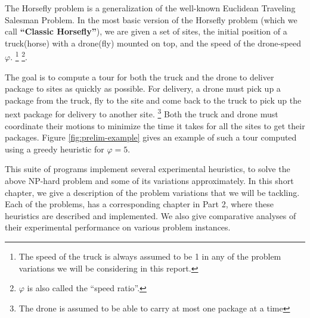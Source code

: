 \documentclass[11.5pt]{report}
\begin{document}
The Horsefly problem is a generalization of the well-known Euclidean Traveling Salesman Problem.
In the most basic version of the Horsefly problem (which we call \textbf{``Classic Horsefly''}), we are given a set of sites, the
initial position of a truck(horse) with a drone(fly) mounted on top, and the speed of the
drone-speed $\varphi$. \footnote{ The speed of the truck is always assumed to be 1 in any of the problem 
  variations we will be considering in this report.} \footnote{ $\varphi$ is also called the ``speed ratio''.}. 

The goal is to compute a tour for both the truck and the drone to deliver package to sites
as quickly as possible. For delivery, a drone must pick up a package from the
truck, fly to the site and come back to the truck to pick up the next package for
delivery to another site. \footnote{ The drone is assumed to be able to carry at most one package at a time }
Both the truck and drone must coordinate their motions to minimize the time it takes for
all the sites to get their packages. Figure \ref{fig:prelim-example} gives an example of such a tour
computed using a greedy heuristic for $\varphi=5$.


This suite of programs implement several experimental heuristics, to solve the above NP-hard
problem and some of its variations approximately. In this short chapter, we give a description 
of the problem variations that we will be tackling. Each of the problems, has a corresponding chapter 
in Part 2, where these heuristics are described and implemented. We also give comparative analyses of 
their experimental performance on various problem instances. 

\vspace{0.5cm}
\end{document}
